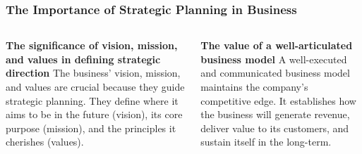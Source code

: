 \documentclass[5pt]{beamer}
\begin{document}
\begin{frame}
\frametitle{The Importance of Strategic Planning in Business}
\begin{columns}
\begin{column}{0.45\textwidth}
\begin{block}{\textbf{The significance of vision, mission, and values in defining strategic direction}}
The business' vision, mission, and values are crucial because they guide strategic planning. They define where it aims to be in the future (vision), its core purpose (mission), and the principles it cherishes (values).
\end{block}
\end{column}
\begin{column}{0.45\textwidth}
\begin{block}{\textbf{The value of a well-articulated business model}}
A well-executed and communicated business model maintains the company's competitive edge. It establishes how the business will generate revenue, deliver value to its customers, and sustain itself in the long-term.
\end{block}
\end{column}
\end{columns}
\end{frame}
\end{document}
